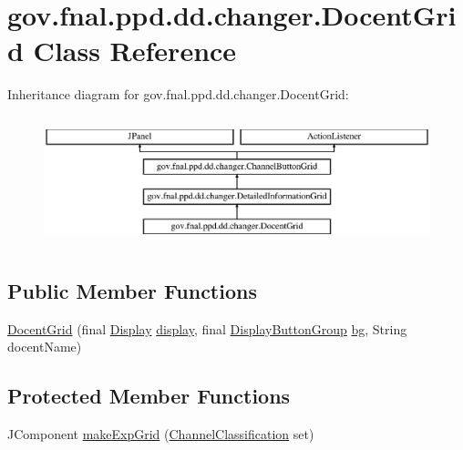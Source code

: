 \hypertarget{classgov_1_1fnal_1_1ppd_1_1dd_1_1changer_1_1DocentGrid}{\section{gov.\-fnal.\-ppd.\-dd.\-changer.\-Docent\-Grid Class Reference}
\label{classgov_1_1fnal_1_1ppd_1_1dd_1_1changer_1_1DocentGrid}
}
Inheritance diagram for gov.\-fnal.\-ppd.\-dd.\-changer.\-Docent\-Grid\-:\begin{figure}[H]
\begin{center}
\leavevmode
\includegraphics[height=3.783784cm]{classgov_1_1fnal_1_1ppd_1_1dd_1_1changer_1_1DocentGrid}
\end{center}
\end{figure}
\subsection*{Public Member Functions}
\begin{DoxyCompactItemize}
\item 
\hyperlink{classgov_1_1fnal_1_1ppd_1_1dd_1_1changer_1_1DocentGrid_a8d11fc4a2cae91c4b626b99ad1c8051a}{Docent\-Grid} (final \hyperlink{interfacegov_1_1fnal_1_1ppd_1_1dd_1_1signage_1_1Display}{Display} \hyperlink{classgov_1_1fnal_1_1ppd_1_1dd_1_1changer_1_1ChannelButtonGrid_a3c06b51489dcaacd16f6efcefe06bcaa}{display}, final \hyperlink{classgov_1_1fnal_1_1ppd_1_1dd_1_1util_1_1DisplayButtonGroup}{Display\-Button\-Group} \hyperlink{classgov_1_1fnal_1_1ppd_1_1dd_1_1changer_1_1ChannelButtonGrid_adf258a89161282e5215b4642ecbec812}{bg}, String docent\-Name)
\end{DoxyCompactItemize}
\subsection*{Protected Member Functions}
\begin{DoxyCompactItemize}
\item 
J\-Component \hyperlink{classgov_1_1fnal_1_1ppd_1_1dd_1_1changer_1_1DocentGrid_a049a89e704008b6edc63cd15cc9b48f4}{make\-Exp\-Grid} (\hyperlink{classgov_1_1fnal_1_1ppd_1_1dd_1_1changer_1_1ChannelClassification}{Channel\-Classification} set)
\end{DoxyCompactItemize}
